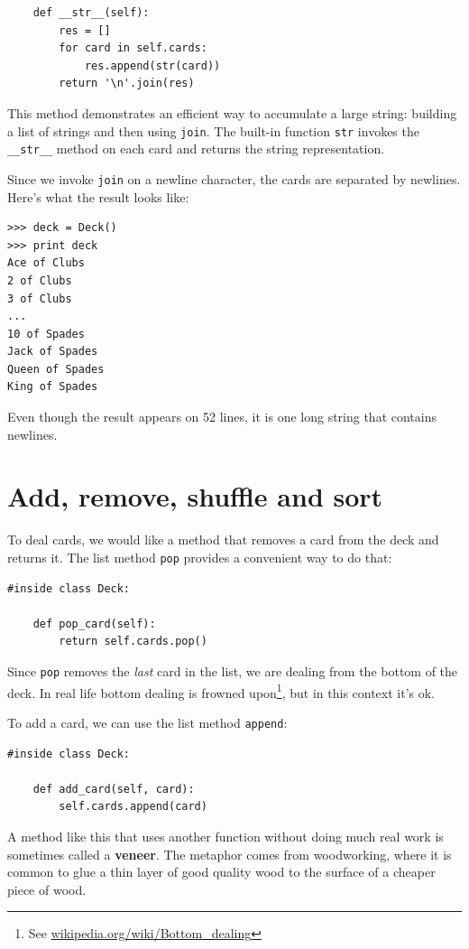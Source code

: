 \documentclass[10pt]{book}
\begin{document}
{\begin{verbatim}
    def __str__(self):
        res = []
        for card in self.cards:
            res.append(str(card))
        return '\n'.join(res)
\end{verbatim}
\afterverb
%
This method demonstrates an efficient way to accumulate a large
string: building a list of strings and then using {\tt join}.
The built-in function {\tt str} invokes the \verb"__str__"
method on each card and returns the string representation.


Since we invoke {\tt join} on a newline character, the cards
are separated by newlines.  Here's what the result looks like:

\beforeverb
\begin{verbatim}
>>> deck = Deck()
>>> print deck
Ace of Clubs
2 of Clubs
3 of Clubs
...
10 of Spades
Jack of Spades
Queen of Spades
King of Spades
\end{verbatim}
\afterverb
%
Even though the result appears on 52 lines, it is
one long string that contains newlines.


\section{Add, remove, shuffle and sort}

To deal cards, we would like a method that
removes a card from the deck and returns it.
The list method {\tt pop} provides a convenient way to do that:


\beforeverb
\begin{verbatim}
#inside class Deck:

    def pop_card(self):
        return self.cards.pop()
\end{verbatim}
\afterverb
%
Since {\tt pop} removes the {\em last} card in the list, we are
dealing from the bottom of the deck.  In real life bottom dealing is
frowned upon\footnote{See \url{wikipedia.org/wiki/Bottom_dealing}},
but in this context it's ok.


To add a card, we can use the list method {\tt append}:

\beforeverb
\begin{verbatim}
#inside class Deck:

    def add_card(self, card):
        self.cards.append(card)
\end{verbatim}
\afterverb
%
A method like this that uses another function without doing
much real work is sometimes called a {\bf veneer}.  The metaphor
comes from woodworking, where it is common to glue a thin
layer of good quality wood to the surface of a cheaper piece of
wood.

}
\end{document}
